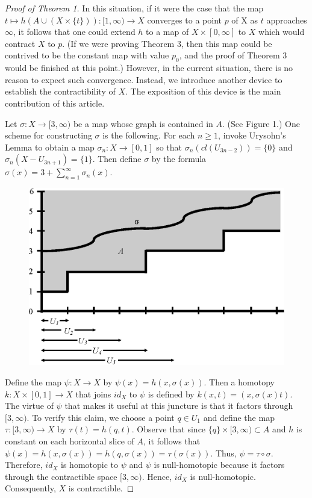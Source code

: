 \documentclass[12pt]{amsart}%
\theoremstyle{plain}
\numberwithin{equation}{section}
\begin{document}
\begin{proof}[Proof of Theorem 1]
\indent In this situation, if it were the case that the map $t \mapsto h(A \cup (X \times \{t\})) : [1,\infty) \rightarrow X$ converges to a point $p$ of X as $t$ approaches $\infty$, it follows that one could extend $h$ to a map of 
$X \times [0,\infty]$ to $X$ which would contract $X$ to $p$.  (If we were proving Theorem 3, then this map could be contrived to be the constant map with value $p_0$, and the proof of Theorem 3 would be finished at this point.)  However, in the current situation, there is no reason to expect such 
convergence.  Instead, we introduce another device to establish the contractibility of $X$.  
The exposition of this device is the main contribution of this article.

\indent Let $\sigma : X \rightarrow [3,\infty)$ be a map whose graph is contained in $A$. (See Figure 1.)  One scheme for constructing $\sigma$ is the following.  For each $n \geq 1$, invoke Urysohn's Lemma to obtain a map $\sigma_n : X \rightarrow [0,1]$ so that $\sigma_n(cl(U_{3n-2})) = \{0\}$ and $\sigma_n(X - U_{3n+1}) = \{1\}$.  Then define $\sigma$ by the formula $\sigma(x) = 3 + \sum_{n=1}^{\infty}\sigma_n(x)$.

\begin{figure}[ht]
\centerline{
\includegraphics{Contractibility_of_Monotone_Unions_-_Figure}
}
\caption{}
\end{figure}

\indent Define the map $\psi : X \rightarrow X$ by $\psi(x) = h(x,\sigma(x))$. Then a homotopy $k : X \times [0,1] \rightarrow X$ that joins $id_X$ to $\psi$ is defined by $k(x,t) = (x,\sigma(x)t)$. The virtue of $\psi$ that makes it useful at this juncture is that it factors through $[3,\infty)$. To verify this claim, we choose a point $q \in U_1$ and define the map $\tau : [3,\infty) \rightarrow X$ by $\tau(t) = h(q,t)$. Observe that since $\{q\} \times [3,\infty) \subset A$ and $h$ is constant on each horizontal slice of $A$, it follows that $\psi(x) = h(x,\sigma(x)) = h(q,\sigma(x)) = \tau(\sigma(x))$. Thus, $\psi = \tau\circ\sigma$. Therefore, $id_X$ is homotopic to $\psi$ and $\psi$ is null-homotopic because it factors through the contractible space $[3,\infty)$.  Hence, $id_X$ is null-homotopic.  Consequently, $X$ is contractible.
\end{proof}
\end{document}
